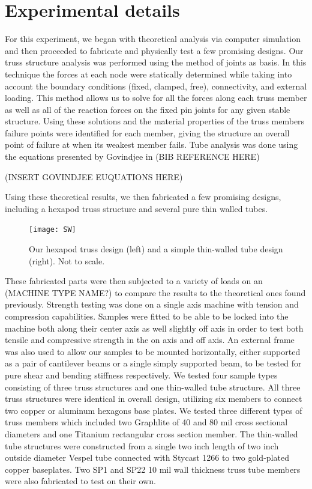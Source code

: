 \documentclass[final]{svjour2}
\begin{document}
\section{Experimental details}
For this experiment, we began with theoretical analysis via computer simulation and then proceeded to fabricate and physically test a few promising designs.  Our truss structure analysis was performed using the method of joints as basis.  In this technique the forces at each node were statically determined while taking into account the boundary conditions (fixed, clamped, free), connectivity, and external loading.  This method allows us to solve for all the forces along each truss member as well as all of the reaction forces on the fixed pin joints for any given stable structure.  Using these solutions and the material properties of the truss members failure points were identified for each member, giving the structure an overall point of failure at when its weakest member fails.  Tube analysis was done using the equations presented by Govindjee in (BIB REFERENCE HERE)

(INSERT GOVINDJEE EUQUATIONS HERE)

Using these theoretical results, we then fabricated a few promising designs, including a hexapod truss structure and several pure thin walled tubes. 

\begin{figure}[!ht]
\begin{center}
\texttt{[image: SW]}
\end{center}
\caption{Our hexapod truss design (left) and a simple thin-walled tube design (right). Not to scale.}
\label{SW}
\end{figure}

These fabricated parts were then subjected to a variety of loads on an (MACHINE TYPE NAME?) to compare the results to the theoretical ones found previously.  Strength testing was done on a single axis machine with tension and compression capabilities. Samples were fitted to be able to be locked into the machine both along their center axis as well slightly off axis in order to test both tensile and compressive strength in the on axis and off axis.  An external frame was also used to allow our samples to be mounted horizontally, either supported as a pair of cantilever beams or a single simply supported beam, to be tested for pure shear and bending stiffness respectively.  We tested four sample types consisting of three truss structures and one thin-walled tube structure.  All three truss structures were identical in overall design, utilizing six members to connect two copper or aluminum hexagons base plates.  We tested three different types of truss members which included two Graphlite of 40 and 80 mil cross sectional diameters and one Titanium rectangular cross section member. The thin-walled tube structures were constructed from a single two inch length of two inch outside diameter Vespel tube connected with Stycast 1266 to two gold-plated copper baseplates. Two SP1 and SP22 10 mil wall thickness truss tube members were also fabricated to test on their own.
\end{document}
